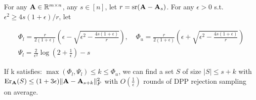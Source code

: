 \documentclass{article}
\begin{document}
\begin{theorem}
	\label{t:upperbound} 	For any $\mathbf A \in \mathbb R^{m\times n}$, any $s\in[n]$, let $r={\mathrm{sr}}(\mathbf A-\mathbf A_s)$. For any $\epsilon > 0$ s.t. $\epsilon^2 \geq 4s(1+\epsilon)/r$, let  
	
	\begin{align*}
	 &\Phi_l = \frac{r}{2(1+\epsilon)} \left(  \epsilon - \sqrt{\epsilon^2 - \frac{4s(1+\epsilon)}{r} }  \right), \; & \Phi_u = \frac{r}{2(1+\epsilon)} \left(  \epsilon + \sqrt{\epsilon^2 - \frac{4s(1+\epsilon)}{r}  }  \right) \\
	 &\Psi_l =  \frac{2}{\epsilon^2} \log (2+ \frac{1}{\epsilon}) - s
	 \end{align*}
	
	
	If k satisfies: $ \max(\Phi_l, \Psi_l) \leq k \leq  \Phi_u$, we can find a set $S$ of size $|S|\leq s+k$ with $\mathrm{Er}_\mathbf A(S)  \leq (1+3\epsilon)  \| \mathbf A - \mathbf A_{s+k}\|_F^2$ with $O(\frac1{\epsilon})$ rounds of DPP rejection sampling on average. 
\end{theorem}
\end{document}
